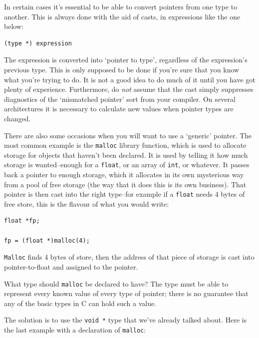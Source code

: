    In certain cases it's essential to be able to convert pointers from
    one type to another. This is always done with the aid of casts, in
    expressions like the one below:


   \begin{Verbatim}
(type *) expression
\end{Verbatim}

   The expression is converted into `pointer to
    type', regardless of the expression's previous type. This
    is only supposed to be done if you're sure that you know what you're
    trying to do. It is not a good idea to do much of it until you have got
    plenty of experience. Furthermore, do \textit{not} assume that the cast
    simply suppresses diagnostics of the `mismatched pointer' sort
    from your compiler. On several architectures it is necessary to
    calculate new values when pointer types are changed.


   There are also some occasions when you will want to use
    a `generic' pointer. The most common example is the
    \texttt{malloc} library function, which is used to allocate storage
    for objects that haven't been declared. It is used by telling it how
    much storage is wanted--enough for a \texttt{float}, or an array
    of \texttt{int}, or whatever. It passes back a pointer to enough
    storage, which it allocates in its own mysterious way from a pool of
    free storage (the way that it does this is its own business). That
    pointer is then cast into the right type--for example if
    a \texttt{float} needs 4 bytes of free store, this is the flavour of
    what you would write:


   \begin{Verbatim}
float *fp;

fp = (float *)malloc(4);
\end{Verbatim}

   \texttt{Malloc} finds 4 bytes of store, then the address of that
    piece of storage is cast into pointer-to-float and assigned to the
    pointer.


   What type should \texttt{malloc} be declared to have? The type
    must be able to represent every known value of every type of pointer;
    there is no guarantee that any of the basic types in C can hold such
    a value.


   The solution is to use the \texttt{void *} type that we've already
    talked about. Here is the last example with a declaration of
    \texttt{malloc}:


